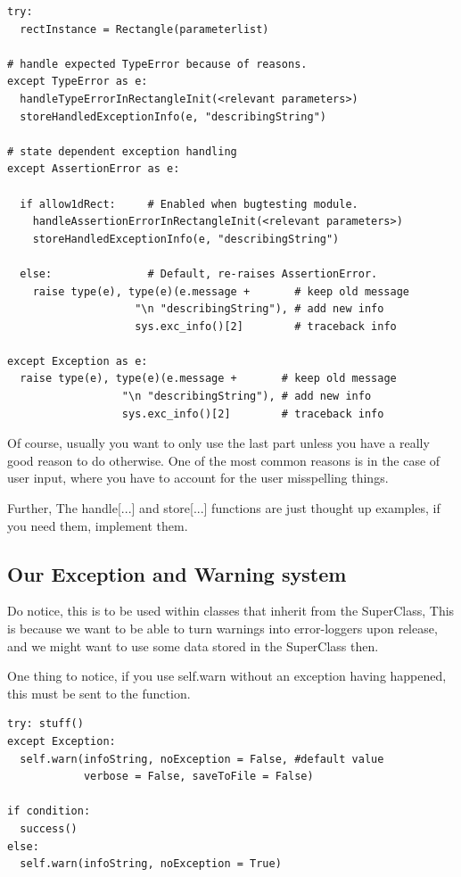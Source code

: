 \documentclass[10pt,a4paper]{article}
\begin{document}
\begin{lstlisting}
try: 
  rectInstance = Rectangle(parameterlist)

# handle expected TypeError because of reasons.
except TypeError as e:  
  handleTypeErrorInRectangleInit(<relevant parameters>)
  storeHandledExceptionInfo(e, "describingString")
  
# state dependent exception handling
except AssertionError as e: 

  if allow1dRect:     # Enabled when bugtesting module. 
    handleAssertionErrorInRectangleInit(<relevant parameters>)
    storeHandledExceptionInfo(e, "describingString")

  else:               # Default, re-raises AssertionError.
    raise type(e), type(e)(e.message +       # keep old message
                    "\n "describingString"), # add new info
                    sys.exc_info()[2]        # traceback info
  
except Exception as e: 
  raise type(e), type(e)(e.message +       # keep old message
                  "\n "describingString"), # add new info
                  sys.exc_info()[2]        # traceback info
\end{lstlisting}
Of course, usually you want to only use the last part unless you have a really good reason to do otherwise. One of the most common reasons is in the case of user input, where you have to account for the user misspelling things.

Further, The handle[...] and store[...] functions are just thought up examples, if you need them, implement them.

\newpage
\subsection{Our Exception and Warning system}

Do notice, this is to be used within classes that inherit from the SuperClass, 
This is because we want to be able to turn warnings into error-loggers upon release, 
and we might want to use some data stored in the SuperClass then. 

One thing to notice, if you use self.warn without an exception having happened, this 
must be sent to the function.

\begin{lstlisting}
try: stuff()
except Exception:
  self.warn(infoString, noException = False, #default value
            verbose = False, saveToFile = False)

if condition: 
  success()
else: 
  self.warn(infoString, noException = True)

\end{lstlisting}
\end{document}
